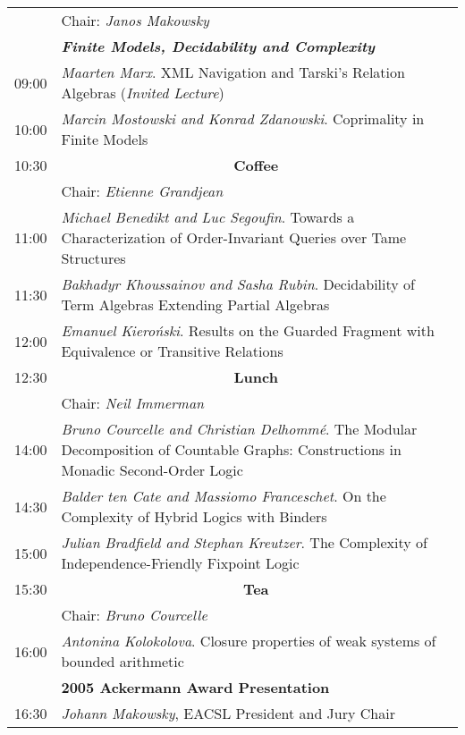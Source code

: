 \documentclass[landscape,12pt]{article}
\newcommand\textbfit[1]{{\bf\em #1}\index{#1}}
\begin{document}
\begin{tabular}{p{1cm}p{21cm}}
& Chair: \emph{Janos Makowsky}\\
&	\textbfit{Finite Models, Decidability and Complexity}\\
09:00 & 	\emph{Maarten Marx}. XML Navigation and Tarski's Relation
Algebras
(\emph{Invited Lecture})\\
10:00 & 	\emph{Marcin Mostowski and Konrad Zdanowski}. Coprimality in Finite Models\\
\hline
10:30 & \multicolumn{1}{c}{\textbf{Coffee}}\\
\hline
& Chair: \emph{Etienne Grandjean}\\
11:00 & 	\emph{Michael Benedikt and Luc Segoufin}. Towards a Characterization of Order-Invariant Queries over Tame Structures\\
11:30 & 	\emph{Bakhadyr Khoussainov and Sasha Rubin}. Decidability of Term Algebras Extending Partial Algebras\\
12:00 & 	\emph{Emanuel Kiero\'nski}. Results on the Guarded Fragment with Equivalence or Transitive Relations\\
\hline
12:30 & 	\multicolumn{1}{c}{\bf Lunch}\\
\hline
& Chair: \emph{Neil Immerman}\\
14:00 & 	\emph{Bruno Courcelle and Christian Delhomm\'e}. The Modular Decomposition of Countable Graphs: Constructions in Monadic Second-Order Logic\\
14:30 & 	\emph{Balder ten Cate and Massiomo Franceschet}. On the Complexity of Hybrid Logics with Binders\\
15:00 & 	\emph{Julian Bradfield and Stephan Kreutzer}. The Complexity of Independence-Friendly Fixpoint Logic\\
\hline
15:30 & \multicolumn{1}{c}{\bf Tea}\\
\hline
& Chair: \emph{Bruno Courcelle}\\
16:00 & 	\emph{Antonina Kolokolova}. Closure properties of weak systems of bounded arithmetic\\
	& \textbf{2005 Ackermann Award Presentation}\\
16:30 & 	\emph{Johann Makowsky}, EACSL President and Jury Chair\\

\end{tabular}
\end{document}
